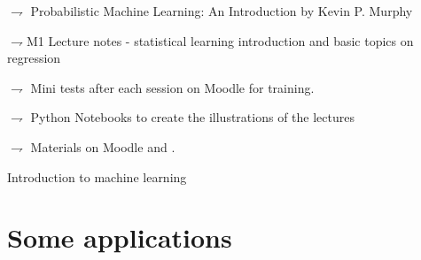 \documentclass[xcolor={usenames,dvipsnames},handout]{beamer}
\begin{document}
\begin{frame}

\vspace{.2cm}

$\rightharpoondown $ Probabilistic Machine Learning: An Introduction by Kevin P. Murphy\\
{\tiny \href{https://probml.github.io/pml-book/book1.html\#toc}{}}

\vspace{.2cm}

 $\rightharpoondown $M1 Lecture notes - statistical learning introduction and basic topics on regression\\
{\tiny \href{https://sylvainlc.github.io/}{}}

\vspace{.5cm}


\vspace{.2cm}

$\rightharpoondown$ Mini tests after each session on Moodle for training.

\vspace{.3cm}

$\rightharpoondown$ Python Notebooks to create the illustrations of the lectures\\
{\tiny \href{https://sylvainlc.github.io/}{}}

\vspace{.2cm}

$\rightharpoondown$ Materials on Moodle and  {\tiny \href{https://sylvainlc.github.io/}{}}.


\end{frame}

\begin{frame}{Introduction to machine learning}
\tableofcontents
\end{frame}



\section{Some applications}
\end{document}
